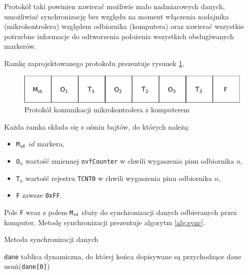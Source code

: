 Protokół taki powinien zawierać możliwie mało nadmiarowych danych, umożliwiać synchronizację bez względu na moment włączenia nadajnika (mikrokontrolera) względem odbiornika (komputera) oraz zawierać wszystkie potrzebne informacje do odtworzenia położenia wszystkich obsługiwanych markerów.

Ramkę zaprojektowanego protokołu prezentuje rysunek \ref{fig:protocol}.

\begin{figure}
 \includegraphics[width=\textwidth]{gfx/diagramy/protokol}
 \caption{Protokół komunikacji mikrokontrolera z komputerem}
 \label{fig:protocol}
\end{figure}

Każda ramka składa się z ośmiu bajtów, do których należą:
\begin{itemize}
 \item \texttt{M$_\textrm{\texttt{id}}$} \ppauza $id$ markera,
 \item \texttt{O$_n$} \ppauza wartość zmiennej \texttt{ovfCounter} w chwili wygaszenia pinu odbiornika $n$,
 \item \texttt{T$_n$} \ppauza wartość rejestru \texttt{TCNT0} w chwili wygaszenia pinu odbiornika $n$,
 \item \texttt{F} \ppauza zawsze \texttt{0xFF}.
\end{itemize}

Pole \texttt{F} wraz z polem \texttt{M$_\textrm{\texttt{id}}$} służy do synchronizacji danych odbieranych przez komputer. Metodę synchronizacji prezentuje algorytm \ref{alg:sync}.

\begin{algorithm}
\caption{Metoda synchronizacji danych}
\label{alg:sync}
\begin{algorithmic}[1]
  \REQUIRE \texttt{dane} \ppauza tablica dynamiczna, do której końca dopisywane są przychodzące dane
      \STATE usuń(\texttt{dane[0]})
    \ENDWHILE
  \ENDWHILE
\end{algorithmic}
\end{algorithm}